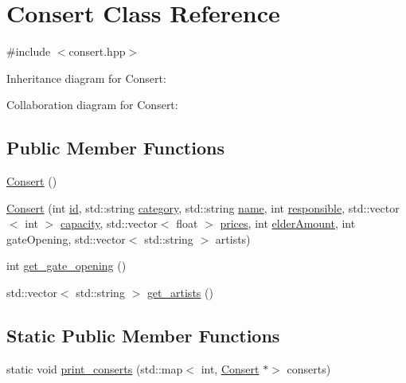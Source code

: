 \hypertarget{class_consert}{}\section{Consert Class Reference}
\label{class_consert}


{\ttfamily \#include $<$consert.\+hpp$>$}



Inheritance diagram for Consert\+:


Collaboration diagram for Consert\+:
\subsection*{Public Member Functions}
\begin{DoxyCompactItemize}
\item 
\hyperlink{class_consert_abb96ae345b4df98d518826145946f2fb}{Consert} ()
\item 
\hyperlink{class_consert_a0e97c64e34ba29760ee32dc6dae5fb0e}{Consert} (int \hyperlink{class_event_a08ba599a781bea8b678251fdb7290890}{id}, std\+::string \hyperlink{class_event_a5634221828f8d3f823598b1fa22e3392}{category}, std\+::string \hyperlink{class_event_ae116bf76fb01a92e000579a5a0d6f35c}{name}, int \hyperlink{class_event_aab3e742a3f882731bd73996f4c66eef1}{responsible}, std\+::vector$<$ int $>$ \hyperlink{class_event_a75eb887870ee5c4a4bf502d98a7cd6a3}{capacity}, std\+::vector$<$ float $>$ \hyperlink{class_event_a49d863913759f2294cc4c8bdbc2be9fe}{prices}, int \hyperlink{class_adult_event_a4c3a51c94f97eff72e54530399955aa0}{elder\+Amount}, int gate\+Opening, std\+::vector$<$ std\+::string $>$ artists)
\item 
int \hyperlink{class_consert_a7b2741a9c6388dc0221822456daf2d0e}{get\+\_\+gate\+\_\+opening} ()
\item 
std\+::vector$<$ std\+::string $>$ \hyperlink{class_consert_a219d4bb1a948f744472ed0c06446d60d}{get\+\_\+artists} ()
\end{DoxyCompactItemize}
\subsection*{Static Public Member Functions}
\begin{DoxyCompactItemize}
\item 
static void \hyperlink{class_consert_a1f5f80b62ada3f9473e0ccb66d34d43f}{print\+\_\+conserts} (std\+::map$<$ int, \hyperlink{class_consert}{Consert} $\ast$$>$ conserts)
\end{DoxyCompactItemize}
